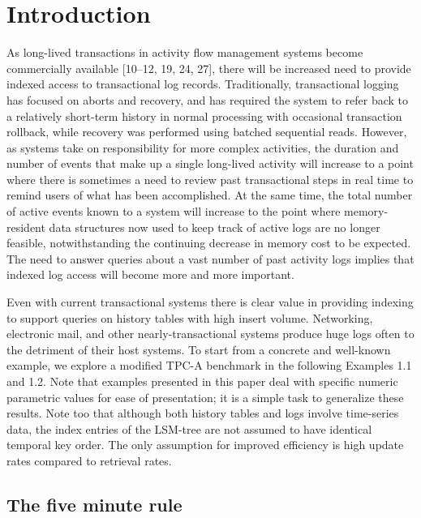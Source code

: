 \documentclass[a4paper,12pt,notitlepage,twoside,openright]{article}
\begin{document}
\hypertarget{introduction}{%
\section{Introduction}\label{introduction}}


As long-lived transactions in activity flow management systems become
commercially available {[}10--12, 19, 24, 27{]}, there will be
increased need to provide indexed access to transactional log records.
Traditionally, transactional logging has focused on aborts and recovery,
and has required the system to refer back to a relatively short-term
history in normal processing with occasional transaction rollback, while
recovery was performed using batched sequential reads. However, as
systems take on responsibility for more complex activities, the duration
and number of events that make up a single long-lived activity will
increase to a point where there is sometimes a need to review past
transactional steps in real time to remind users of what has been
accomplished. At the same time, the total number of active events known
to a system will increase to the point where memory-resident data
structures now used to keep track of active logs are no longer feasible,
notwithstanding the continuing decrease in memory cost to be expected.
The need to answer queries about a vast number of past activity logs
implies that indexed log access will become more and more important.

Even with current transactional systems there is clear value in
providing indexing to support queries on history tables with high insert
volume. Networking, electronic mail, and other nearly-transactional
systems produce huge logs often to the detriment of their host systems.
To start from a concrete and well-known example, we explore a modified
TPC-A benchmark in the following Examples 1.1 and 1.2. Note that
examples presented in this paper deal with specific numeric parametric
values for ease of presentation; it is a simple task to generalize these
results. Note too that although both history tables and logs involve
time-series data, the index entries of the LSM-tree are not assumed to
have identical temporal key order. The only assumption for improved
efficiency is high update rates compared to retrieval rates.


\hypertarget{the-five-minute-rule}{%
\subsection{The five minute rule}\label{the-five-minute-rule}}
\end{document}
